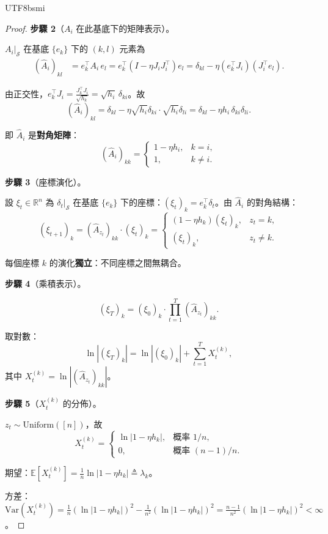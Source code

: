 \documentclass[11pt,a4paper]{article}
\theoremstyle{definition}
\newcommand{\R}{\mathbb{R}}
\newcommand{\E}{\mathbb{E}}
\newcommand{\cS}{\mathcal{S}}
\begin{document}
\begin{CJK}{UTF8}{bsmi}
\begin{proof}
  \textbf{步驟 2}（$A_i$ 在此基底下的矩陣表示）。

  $A_i|_\cS$ 在基底 $\{e_k\}$ 下的 $(k,l)$ 元素為
  \begin{align*}
    (\hat{A}_i)_{kl}
    &=e_k^\top A_i\,e_l
    =e_k^\top(I-\eta J_iJ_i^\top)e_l
    =\delta_{kl}-\eta(e_k^\top J_i)(J_i^\top e_l).
  \end{align*}

  由正交性，$e_k^\top J_i=\frac{J_k^\top J_i}{\sqrt{h_k}}=\sqrt{h_i}\,\delta_{ki}$。故
  \[
    (\hat{A}_i)_{kl}=\delta_{kl}-\eta\sqrt{h_i}\delta_{ki}\cdot\sqrt{h_i}\delta_{li}
    =\delta_{kl}-\eta h_i\,\delta_{ki}\delta_{li}.
  \]

  即 $\hat{A}_i$ 是\textbf{對角矩陣}：
  \[
    (\hat{A}_i)_{kk}=\begin{cases}1-\eta h_i,&k=i,\\1,&k\neq i.\end{cases}
  \]

  \textbf{步驟 3}（座標演化）。

  設 $\xi_t\in\R^n$ 為 $\delta_t|_\cS$ 在基底 $\{e_k\}$ 下的座標：$(\xi_t)_k=e_k^\top\delta_t$。由 $\hat{A}_i$ 的對角結構：
  \[
    (\xi_{t+1})_k=(\hat{A}_{z_t})_{kk}\cdot(\xi_t)_k
    =\begin{cases}(1-\eta h_k)(\xi_t)_k,&z_t=k,\\(\xi_t)_k,&z_t\neq k.\end{cases}
  \]

  每個座標 $k$ 的演化\textbf{獨立}：不同座標之間無耦合。

  \textbf{步驟 4}（乘積表示）。

  \[
    (\xi_T)_k=(\xi_0)_k\cdot\prod_{t=1}^T(\hat{A}_{z_t})_{kk}.
  \]

  取對數：
  \[
    \ln|(\xi_T)_k|=\ln|(\xi_0)_k|+\sum_{t=1}^T X_t^{(k)},
  \]
  其中 $X_t^{(k)}=\ln|(\hat{A}_{z_t})_{kk}|$。

  \textbf{步驟 5}（$X_t^{(k)}$ 的分佈）。

  $z_t\sim\mathrm{Uniform}([n])$，故
  \[
    X_t^{(k)}=\begin{cases}\ln|1-\eta h_k|,&\text{概率 }1/n,\\0,&\text{概率 }(n-1)/n.\end{cases}
  \]

  期望：$\E[X_t^{(k)}]=\frac{1}{n}\ln|1-\eta h_k|\triangleq\lambda_k$。

  方差：$\mathrm{Var}(X_t^{(k)})=\frac{1}{n}(\ln|1-\eta h_k|)^2-\frac{1}{n^2}(\ln|1-\eta h_k|)^2=\frac{n-1}{n^2}(\ln|1-\eta h_k|)^2<\infty$。


\end{proof}
\end{CJK}
\end{document}
